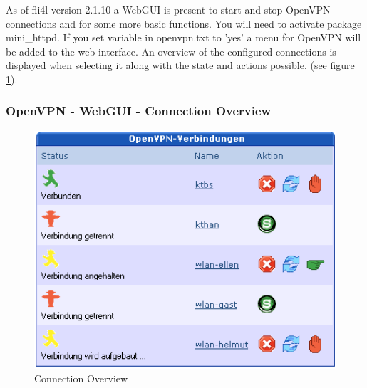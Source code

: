 As of fli4l version 2.1.10 a WebGUI is present to start and stop OpenVPN 
connections and for some more basic functions. You will need to activate package 
mini\_httpd. If you set variable  in openvpn.txt to 'yes' a menu 
for OpenVPN will be added to the web interface.  An overview of the configured 
connections is displayed when selecting it along with the state and actions 
possible. (see figure \ref{fig:guiact}).

\subsubsection{OpenVPN - WebGUI - Connection Overview}
  \begin{figure}[!h]
    \centering
    \includegraphics[width=400pt]{verbindungen}
    \caption{Connection Overview}
    \label{fig:guiact}
  \end{figure}

